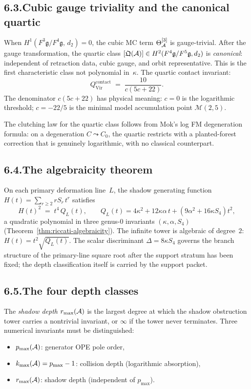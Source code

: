 \subsection*{6.3.\enspace Cubic gauge triviality and the canonical quartic}

When $H^1(F^3\mathfrak g/F^4\mathfrak g,\,d_2)=0$, the cubic
MC term $\Theta^{[3]}_{\mathcal{A}}$ is gauge-trivial. After the gauge
transformation, the quartic class
$[\mathfrak Q(\mathcal{A})]\in H^2(F^4\mathfrak g/F^5\mathfrak g,d_2)$
is \emph{canonical}: independent of retraction data, cubic gauge,
and orbit representative. This is the first characteristic class
not polynomial in~$\kappa$. The quartic contact invariant:
\[
Q^{\mathrm{contact}}_{\mathrm{Vir}}
\;=\;
\frac{10}{c(5c+22)}.
\]
The denominator $c(5c+22)$ has physical meaning: $c=0$ is the
logarithmic threshold; $c=-22/5$ is the minimal model
accumulation point $\mathcal M(2,5)$.

The clutching law for the quartic class follows from Mok's log
FM degeneration formula: on a degeneration $C\leadsto C_0$, the
quartic restricts with a planted-forest correction that is
genuinely logarithmic, with no classical counterpart.

\subsection*{6.4.\enspace The algebraicity theorem}

On each primary deformation line~$L$, the shadow generating
function $H(t)=\sum_{r\ge 2}rS_r\,t^r$ satisfies
\[
H(t)^2\;=\;t^4\,Q_L(t),
\qquad
Q_L(t)=4\kappa^2+12\kappa\alpha\,t+(9\alpha^2+16\kappa S_4)t^2,
\]
a quadratic polynomial in three genus-$0$ invariants
$(\kappa,\alpha,S_4)$
(Theorem~\ref{thm:riccati-algebraicity}). The infinite tower is
algebraic of degree~$2$: $H(t)=t^2\sqrt{Q_L(t)}$. The scalar
discriminant $\Delta = 8\kappa S_4$ governs the branch structure of
the primary-line square root after the support stratum has been fixed;
the depth classification itself is carried by the support packet.

\subsection*{6.5.\enspace The four depth classes}

The \emph{shadow depth} $r_{\max}(\mathcal{A})$ is the largest degree at
which the shadow obstruction tower carries a nontrivial
invariant, or $\infty$ if the tower never terminates. Three
numerical invariants must be distinguished:
\begin{itemize}[nosep]
\item $p_{\max}(\mathcal{A})$: generator OPE pole order,
\item $k_{\max}(\mathcal{A})=p_{\max}-1$: collision depth
 (logarithmic absorption),
\item $r_{\max}(\mathcal{A})$: shadow depth (independent of
 $p_{\max}$).
\end{itemize}

